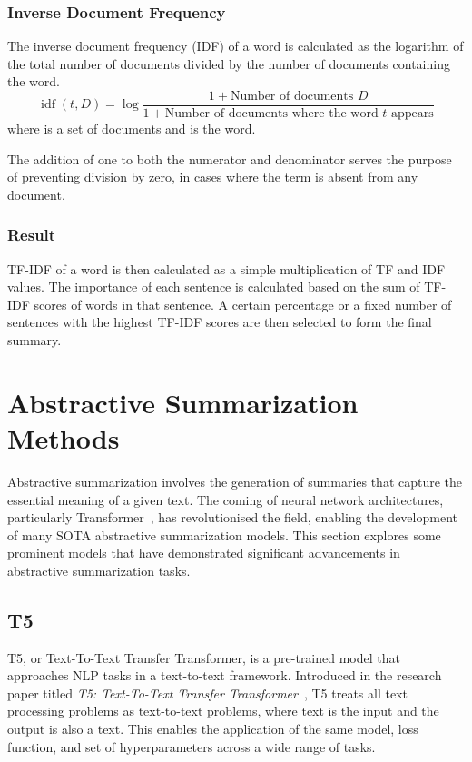 \documentclass[english, ba, kiv, he, iso690numb, pdf, viewonly]{fasthesis}
\begin{document}
\subsubsection{Inverse Document Frequency}
The inverse document frequency (IDF) of a word is calculated as the logarithm of the total number of documents divided by the number of documents containing the word.
$$
\operatorname{idf}(t, D)=\log \frac{1 + \text{Number of documents } D}{1 + \text{Number of documents where the word } t \text{ appears}}
$$
where  is a set of documents and  is the word.

The addition of one to both the numerator and denominator serves the purpose of preventing division by zero, in cases where the term  is absent from any document.

\subsubsection{Result}
TF-IDF of a word  is then calculated as a simple multiplication of TF and IDF values. 
The importance of each sentence is calculated based on the sum of TF-IDF scores of words in that sentence. A certain percentage or a fixed number of sentences with the highest TF-IDF scores are then selected to form the final summary.

\section{Abstractive Summarization Methods}
Abstractive summarization involves the generation of summaries that capture the essential meaning of a given text. The coming of neural network architectures, particularly Transformer~\cite{vaswani2023attention}, has revolutionised the field, enabling the development of many SOTA abstractive summarization models. This section explores some prominent models that have demonstrated significant advancements in abstractive summarization tasks.

\subsection{T5} \label{subsec:T5}
T5, or Text-To-Text Transfer Transformer, is a pre-trained model that approaches NLP tasks in a text-to-text framework. Introduced in the research paper titled \textit{T5: Text-To-Text Transfer Transformer}~\cite{2020t5}, T5 treats all text processing problems as text-to-text problems, where text is the input and the output is also a text. This enables the application of the same model, loss function, and set of hyperparameters across a wide range of tasks. 
\end{document}
